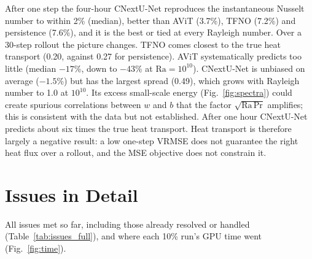 \documentclass[11pt]{article}
\begin{document}
After one step the four-hour CNextU-Net reproduces the instantaneous Nusselt number to within 2\% (median), better
than AViT (3.7\%), TFNO (7.2\%) and persistence (7.6\%), and it is the best or tied at every Rayleigh number. Over a 30-step
rollout the picture changes. TFNO comes closest to the true heat transport (0.20, against 0.27 for persistence).
AViT systematically predicts too little (median $-17$\%, down to $-43$\% at $\mathrm{Ra}=10^{10}$). CNextU-Net is
unbiased on average ($-1.5$\%) but has the largest spread (0.49), which grows with Rayleigh number to 1.0 at
$10^{10}$. Its excess small-scale energy (Fig.~\ref{fig:spectra}) could create spurious correlations between $w$ and
$b$ that the factor $\sqrt{\mathrm{Ra}\,\mathrm{Pr}}$ amplifies; this is consistent with the data but not
established. After one hour CNextU-Net predicts about six times the true heat transport. Heat transport is
therefore largely a negative result: a low one-step VRMSE does not guarantee the right heat flux over a rollout, and
the MSE objective does not constrain it.

\FloatBarrier
\section{Issues in Detail}
\label{app:issues}

All issues met so far, including those already resolved or handled (Table~\ref{tab:issues_full}), and where each 10\% run's GPU time went (Fig.~\ref{fig:time}).
\end{document}
